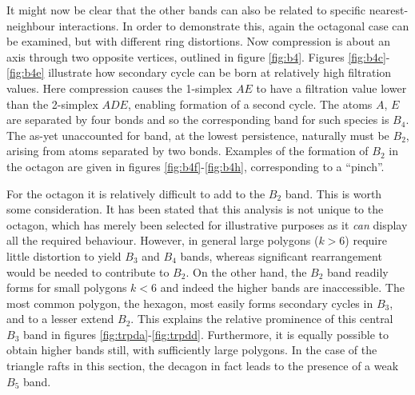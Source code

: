 It might now be clear that the other bands can also be related to specific nearest\--neighbour interactions.
In order to demonstrate this, again the octagonal case can be examined, but with different ring distortions.
Now compression is about an axis through two opposite vertices, outlined in figure \ref{fig:b4}.
Figures \ref{fig:b4c}\--\ref{fig:b4e} illustrate how secondary cycle can be born at relatively high filtration values.
Here compression causes the 1\--simplex $AE$ to have a filtration value lower than the 2\--simplex $ADE$, enabling formation of a second cycle.
The atoms $A$, $E$ are separated by four bonds and so the corresponding band for such species is $B_4$.
The as\--yet unaccounted for band, at the lowest persistence, naturally must be $B_2$, arising from atoms separated by two bonds.
Examples of the formation of $B_2$ in the octagon are given in figures \ref{fig:b4f}\--\ref{fig:b4h}, corresponding to a ``pinch''.

For the octagon it is relatively difficult to add to the $B_2$ band.
This is worth some consideration. 
It has been stated that this analysis is not unique to the octagon, which has merely been selected for illustrative purposes as it \textit{can} display all the required behaviour.
However, in general large polygons ($k>6$) require little distortion to yield $B_3$ and $B_4$ bands, whereas significant rearrangement would be needed to contribute to $B_2$.
On the other hand, the $B_2$ band readily forms for small polygons $k<6$ and indeed the higher bands are inaccessible.
The most common polygon, the hexagon, most easily forms secondary cycles in $B_3$, and to a lesser extend $B_2$. 
This explains the relative prominence of this central $B_3$ band in figures \ref{fig:trpda}\--\ref{fig:trpdd}.
Furthermore, it is equally possible to obtain higher bands still, with sufficiently large polygons.
In the case of the triangle rafts in this section, the decagon in fact leads to the presence of a weak $B_5$ band.

